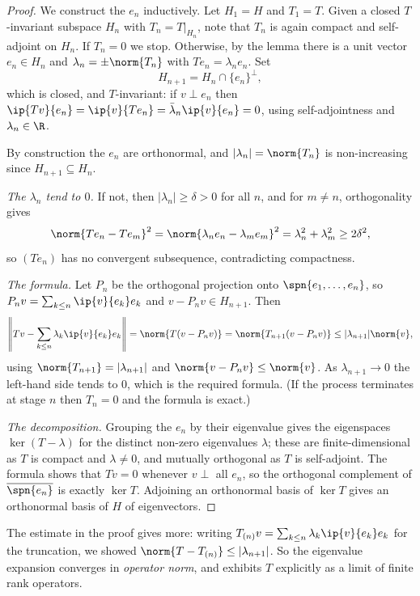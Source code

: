 \begin{proof}
	We construct the $e_n$ inductively. Let $H_1 = H$ and $T_1 = T$. Given a closed $T$-invariant subspace $H_n$ with $T_n = T|_{H_n}$, note that $T_n$ is again compact and self-adjoint on $H_n$. If $T_n = 0$ we stop. Otherwise, by the lemma there is a unit vector $e_n\in H_n$ and $\lambda_n = \pm\norm{T_n}$ with $T e_n = \lambda_ne_n$. Set
	$$H_{n+1} = H_n \cap \{e_n\}^\perp,$$
	which is closed, and $T$-invariant: if $v \perp e_n$ then $\ip{Tv}{e_n} = \ip{v}{Te_n}=\bar\lambda_n\ip{v}{e_n}=0$, using self-adjointness and $\lambda_n\in\R$.

	By construction the $e_n$ are orthonormal, and $|\lambda_n| = \norm{T_n}$ is non-increasing since $H_{n+1}\subseteq H_n$.

	\emph{The $\lambda_n$ tend to $0$.} If not, then $|\lambda_n|\geq\delta>0$ for all $n$, and for $m \neq n$, orthogonality gives
	$$\norm{Te_n - Te_m}^2 = \norm{\lambda_ne_n-\lambda_me_m}^2 = \lambda_n^2+\lambda_m^2\geq2\delta^2,$$
	so $(Te_n)$ has no convergent subsequence, contradicting compactness.

	\emph{The formula.} Let $P_n$ be the orthogonal projection onto $\spn\{e_1,\dots,e_n\}$, so $P_nv = \sum_{k\leq n}\ip{v}{e_k}e_k$ and $v - P_nv \in H_{n+1}$. Then
	$$\left\| Tv - \sum_{k\leq n}\lambda_k\ip{v}{e_k}e_k\right\| = \norm{T(v - P_nv)} = \norm{T_{n+1}(v-P_nv)}\leq|\lambda_{n+1}|\norm{v},$$
	using $\norm{T_{n+1}} = |\lambda_{n+1}|$ and $\norm{v - P_nv}\leq\norm{v}$. As $\lambda_{n+1}\to0$ the left-hand side tends to $0$, which is the required formula. (If the process terminates at stage $n$ then $T_{n} = 0$ and the formula is exact.)

	\emph{The decomposition.} Grouping the $e_n$ by their eigenvalue gives the eigenspaces $\ker(T-\lambda)$ for the distinct non-zero eigenvalues $\lambda$; these are finite-dimensional as $T$ is compact and $\lambda \neq 0$, and mutually orthogonal as $T$ is self-adjoint. The formula shows that $Tv = 0$ whenever $v \perp$ all $e_n$, so the orthogonal complement of $\overline{\spn\{e_n\}}$ is exactly $\ker T$. Adjoining an orthonormal basis of $\ker T$ gives an orthonormal basis of $H$ of eigenvectors.
\end{proof}

\begin{remark}
	The estimate in the proof gives more: writing $T_{(n)}v = \sum_{k\leq n}\lambda_k\ip{v}{e_k}e_k$ for the truncation, we showed $\norm{T - T_{(n)}}\leq|\lambda_{n+1}|$. So the eigenvalue expansion converges in \emph{operator norm}, and exhibits $T$ explicitly as a limit of finite rank operators.
\end{remark}

